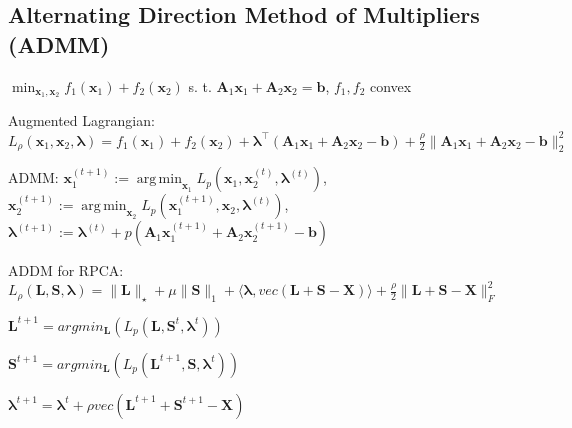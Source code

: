 \documentclass[a4paper, 11pt, landscape]{article}
\DeclareMathOperator*{\argmin}{arg\,min}
\begin{document}
\begin{multicols*}{3}
    \subsection{Alternating Direction Method of Multipliers (ADMM)}
    $\min_{\mathbf{x}_1, \mathbf{x}_2} f_1(\mathbf{x}_1) + f_2(\mathbf{x}_2)$ s. t. $\mathbf{A}_1 \mathbf{x}_1 + \mathbf{A}_2 \mathbf{x}_2 = \mathbf{b}$, $f_1, f_2$ convex
    \begin{inparaitem}[\color{red}\textbullet]
    \item Augmented Lagrangian: $L_\rho(\mathbf{x}_1, \mathbf{x}_2, \boldsymbol{\lambda}) = 
        f_1(\mathbf{x}_1) + f_2(\mathbf{x}_2) + 
        \boldsymbol{\lambda}^\top (\mathbf{A}_1 \mathbf{x}_1 + \mathbf{A}_2 \mathbf{x}_2 - \mathbf{b}) + \frac{\rho}{2}\| \mathbf{A}_1 \mathbf{x}_1 + \mathbf{A}_2 \mathbf{x}_2 - \mathbf{b} \|_2^2$
    \item ADMM: $\mathbf{x}_1^{(t+1)} := \argmin_{\mathbf{x}_1} L_p(\mathbf{x}_1, \mathbf{x}_2^{(t)}, 
        \boldsymbol{\lambda}^{(t)})$, $\mathbf{x}_2^{(t+1)} := \argmin_{\mathbf{x}_2} L_p(\mathbf{x}_1^{(t+1)}, \mathbf{x}_2, \boldsymbol{\lambda}^{(t)})$, $\boldsymbol{\lambda}^{(t+1)} 
        := \boldsymbol{\lambda}^{(t)} + p(\mathbf{A}_1 \mathbf{x}_1^{(t+1)} + \mathbf{A}_2 \mathbf{x}_2^{(t+1)} - \mathbf{b})$
    \item ADDM for RPCA: 
        $L_\rho(\mathbf{L}, \mathbf{S}, \mathbf{\lambda}) = 
        \|\mathbf{L}\|_\star 
        + \mu \| \mathbf{S} \|_1 
        + \langle \mathbf{\lambda}, vec(\mathbf{L} + \mathbf{S} - \mathbf{X}) \rangle
        + \frac{\rho}{2}\|\mathbf{L} + \mathbf{S} - \mathbf{X}\|_{F}^2
            $
    
        \item $\mathbf{L}^{t+1} = argmin_{\mathbf{L}}(L_p(\mathbf{L}, \mathbf{S}^t, \mathbf{\lambda}^t) )$
        \item $\mathbf{S}^{t+1} = argmin_{\mathbf{L}}(L_p(\mathbf{L}^{t+1}, \mathbf{S}, \mathbf{\lambda}^t) )$
        \item $\mathbf{\lambda}^{t+1} = \mathbf{\lambda}^{t} + \rho vec(\mathbf{L}^{t+1} + \mathbf{S}^{t+1} - \mathbf{X})$

    \end{inparaitem}

    \raggedcolumns
\end{multicols*}
\end{document}
